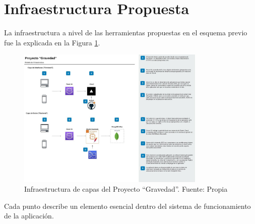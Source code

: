 \section{Infraestructura Propuesta}

La infraestructura a nivel de las herramientas propuestas en el esquema previo fue la explicada en la Figura \ref{figure:infraDiagram}.

\begin{figure}[H]
\centering
\includegraphics[width=0.80\textwidth]{img/13.jpg}
\caption{Infraestructura de capas del Proyecto “Gravedad”.
Fuente: Propia}
\label{figure:infraDiagram}
\end{figure}

Cada punto describe un elemento esencial dentro del sistema de funcionamiento de la aplicación.

